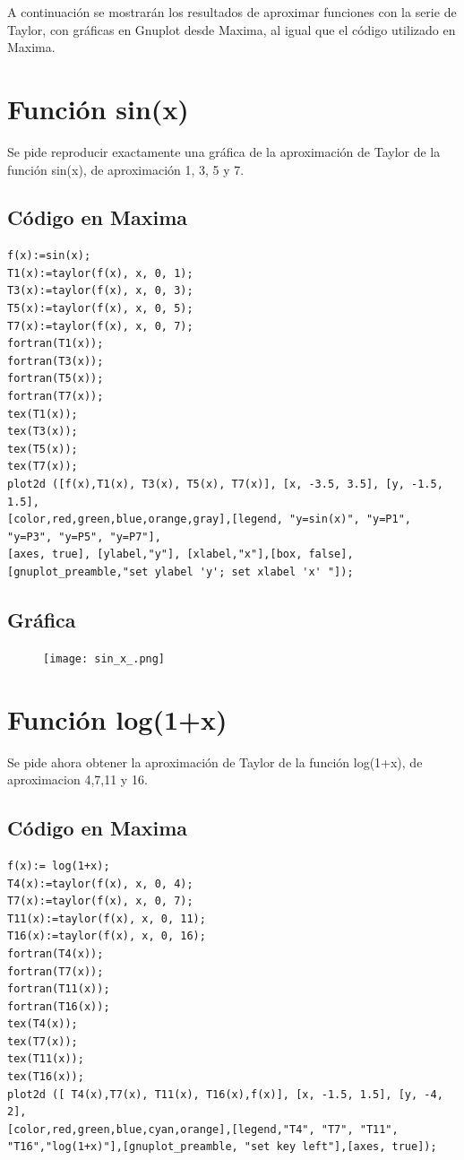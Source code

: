\documentclass[a4paper]{article}
\begin{document}
A continuación se mostrarán los resultados de aproximar funciones con la serie de Taylor, con gráficas en Gnuplot desde Maxima, al igual que el código utilizado en Maxima.

\section{Función sin(x)}
Se pide reproducir exactamente una gráfica de la aproximación de Taylor de la función sin(x), de aproximación 1, 3, 5 y 7.

\subsection{Código en Maxima}

 \begin{verbatim}
f(x):=sin(x);
T1(x):=taylor(f(x), x, 0, 1);
T3(x):=taylor(f(x), x, 0, 3);
T5(x):=taylor(f(x), x, 0, 5);
T7(x):=taylor(f(x), x, 0, 7);
fortran(T1(x));
fortran(T3(x));
fortran(T5(x));
fortran(T7(x));
tex(T1(x));
tex(T3(x));
tex(T5(x));
tex(T7(x));
plot2d ([f(x),T1(x), T3(x), T5(x), T7(x)], [x, -3.5, 3.5], [y, -1.5, 1.5],
[color,red,green,blue,orange,gray],[legend, "y=sin(x)", "y=P1", "y=P3", "y=P5", "y=P7"],
[axes, true], [ylabel,"y"], [xlabel,"x"],[box, false],
[gnuplot_preamble,"set ylabel 'y'; set xlabel 'x' "]);
\end{verbatim}

\subsection{Gráfica}

\begin{figure}[h]
\centering
\texttt{[image: sin\_x\_.png]}
\end{figure}

\section{Función log(1+x)}

Se pide ahora obtener la aproximación de Taylor de la función log(1+x), de aproximacion 4,7,11 y 16.

\subsection{Código en Maxima}

 \begin{verbatim}
f(x):= log(1+x);
T4(x):=taylor(f(x), x, 0, 4);
T7(x):=taylor(f(x), x, 0, 7);
T11(x):=taylor(f(x), x, 0, 11);
T16(x):=taylor(f(x), x, 0, 16);
fortran(T4(x));
fortran(T7(x));
fortran(T11(x));
fortran(T16(x));
tex(T4(x));
tex(T7(x));
tex(T11(x));
tex(T16(x));
plot2d ([ T4(x),T7(x), T11(x), T16(x),f(x)], [x, -1.5, 1.5], [y, -4, 2],
[color,red,green,blue,cyan,orange],[legend,"T4", "T7", "T11",
"T16","log(1+x)"],[gnuplot_preamble, "set key left"],[axes, true]);
\end{verbatim}
\end{document}
